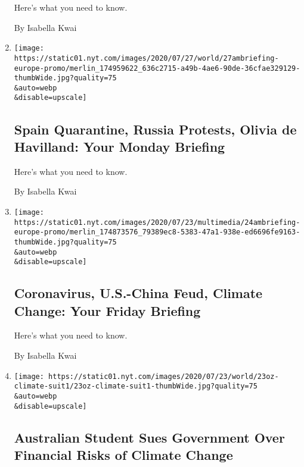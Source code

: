 \begin{enumerate}
  Here's what you need to know.

  By Isabella Kwai
\item
  \href{/2020/07/27/briefing/spain-quarantine-russia-protests-olivia-de-havilland.html}{}

  \texttt{[image: https://static01.nyt.com/images/2020/07/27/world/27ambriefing-europe-promo/merlin\_174959622\_636c2715-a49b-4ae6-90de-36cfae329129-thumbWide.jpg?quality=75\\\&auto=webp\\\&disable=upscale]}

  \hypertarget{spain-quarantine-russia-protests-olivia-de-havilland-your-monday-briefing}{%
  \subsection{Spain Quarantine, Russia Protests, Olivia de Havilland:
  Your Monday
  Briefing}\label{spain-quarantine-russia-protests-olivia-de-havilland-your-monday-briefing}}

  Here's what you need to know.

  By Isabella Kwai
\item
  \href{/2020/07/24/briefing/coronavirus-america-china-consulates-climate-change.html}{}

  \texttt{[image: https://static01.nyt.com/images/2020/07/23/multimedia/24ambriefing-europe-promo/merlin\_174873576\_79389ec8-5383-47a1-938e-ed6696fe9163-thumbWide.jpg?quality=75\\\&auto=webp\\\&disable=upscale]}

  \hypertarget{coronavirus-us-china-feud-climate-change-your-friday-briefing}{%
  \subsection{Coronavirus, U.S.-China Feud, Climate Change: Your Friday
  Briefing}\label{coronavirus-us-china-feud-climate-change-your-friday-briefing}}

  Here's what you need to know.

  By Isabella Kwai
\item
  \href{/2020/07/23/world/australia/lawsuit-climate-change-bonds.html}{}

  \texttt{[image: https://static01.nyt.com/images/2020/07/23/world/23oz-climate-suit1/23oz-climate-suit1-thumbWide.jpg?quality=75\\\&auto=webp\\\&disable=upscale]}

  \hypertarget{australian-student-sues-government-over-financial-risks-of-climate-change}{%
  \subsection{Australian Student Sues Government Over Financial Risks of
  Climate
  Change}\label{australian-student-sues-government-over-financial-risks-of-climate-change}}


\end{enumerate}
